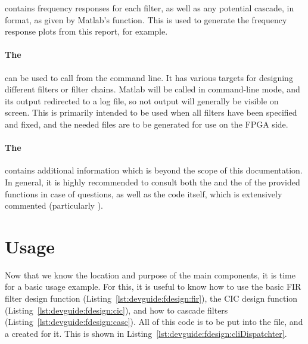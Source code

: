  contains frequency  responses for each filter, as  well as any
potential cascade, in  format,  as given by Matlab's 
function.  This  is used to  generate the  frequency response plots  from this
report, for example.

\paragraph{The  } can  be used  to call  
from the command line. It has  various targets for designing different filters
or filter chains. Matlab  will be called in command-line mode,  and its output
redirected  to  a  log file,  so  not  output  will  generally be  visible  on
screen. This  is primarily  intended to  be used  when all  filters have  been
specified and fixed, and  the needed files are to be generated  for use on the
FPGA side.

\paragraph{The  }  contains  additional information  which  is
beyond the scope  of this documentation. In general, it  is highly recommended
to  consult  both  the    and the    of  the  provided
functions  in  case  of questions,  as  well  as  the  code itself,  which  is
extensively commented (particularly ).


\section{Usage} %
\label{sec:devguide:filter_toolchain:usage}

Now that we know  the location and purpose of the main  components, it is time
for a basic usage example. For this, it is useful to know how to use the basic
FIR filter  design function (Listing~\ref{lst:devguide:fdesign:fir}),  the CIC
design function  (Listing~\ref{lst:devguide:fdesign:cic}), and how  to cascade
filters (Listing~\ref{lst:devguide:fdesign:casc}). All  of this code is  to be
put  into  the   file,  and  a   created  for
it. This is shown in Listing~\ref{lst:devguide:fdesign:cliDispatchter}.


